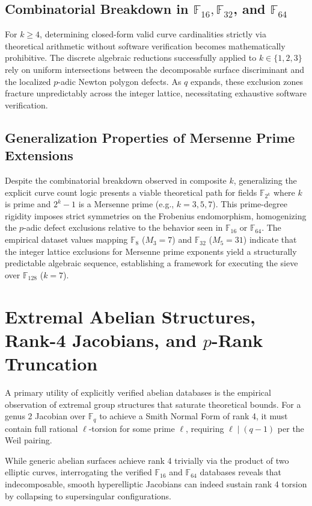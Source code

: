 \documentclass[letterpaper, 11pt]{article}
\begin{document}
\subsection{Combinatorial Breakdown in \texorpdfstring{$\mathbb{F}_{16}, \mathbb{F}_{32}$}{F\_16, F\_32}, and \texorpdfstring{$\mathbb{F}_{64}$}{F\_64}}
For $k \ge 4$, determining closed-form valid curve cardinalities strictly via theoretical arithmetic without software verification becomes mathematically prohibitive. The discrete algebraic reductions successfully applied to $k \in \{1, 2, 3\}$ rely on uniform intersections between the decomposable surface discriminant and the localized $p$-adic Newton polygon defects. As $q$ expands, these exclusion zones fracture unpredictably across the integer lattice, necessitating exhaustive software verification.

\subsection{Generalization Properties of Mersenne Prime Extensions}
Despite the combinatorial breakdown observed in composite $k$, generalizing the explicit curve count logic presents a viable theoretical path for fields $\mathbb{F}_{2^k}$ where $k$ is prime and $2^k - 1$ is a Mersenne prime (e.g., $k=3, 5, 7$). This prime-degree rigidity imposes strict symmetries on the Frobenius endomorphism, homogenizing the $p$-adic defect exclusions relative to the behavior seen in $\mathbb{F}_{16}$ or $\mathbb{F}_{64}$. The empirical dataset values mapping $\mathbb{F}_8$ ($M_3=7$) and $\mathbb{F}_{32}$ ($M_5=31$) indicate that the integer lattice exclusions for Mersenne prime exponents yield a structurally predictable algebraic sequence, establishing a framework for executing the sieve over $\mathbb{F}_{128}$ ($k=7$).

\section{Extremal Abelian Structures, Rank-4 Jacobians, and \texorpdfstring{$p$}{p}-Rank Truncation}
A primary utility of explicitly verified abelian databases is the empirical observation of extremal group structures that saturate theoretical bounds. For a genus 2 Jacobian over $\mathbb{F}_q$ to achieve a Smith Normal Form of rank 4, it must contain full rational $\ell$-torsion for some prime $\ell$, requiring $\ell \mid (q-1)$ per the Weil pairing. 

While generic abelian surfaces achieve rank 4 trivially via the product of two elliptic curves, interrogating the verified $\mathbb{F}_{16}$ and $\mathbb{F}_{64}$ databases reveals that indecomposable, smooth hyperelliptic Jacobians can indeed sustain rank 4 torsion by collapsing to supersingular configurations. 
\end{document}
